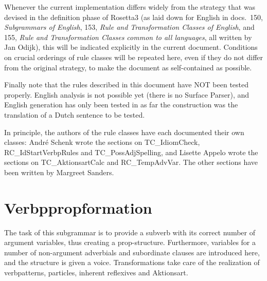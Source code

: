 Whenever the current implementation differs widely from the strategy that was 
devised in the definition phase of Rosetta3 (as laid down for English in docs.\ 
150, {\em Subgrammars of English\/}, 153, {\em Rule and Transformation Classes 
of English\/}, and 155, {\em Rule and Transformation Classes common to all 
languages\/}, all written by Jan Odijk), this will be indicated explicitly in 
the current document. Conditions on crucial orderings of rule classes will be 
repeated here, even if they do not differ from the original strategy, to make 
the document as self-contained as possible.

Finally note that the rules described in this document have NOT been tested 
properly. English analysis is not possible yet (there is no Surface Parser), 
and English generation has only been tested in as far the construction was the 
translation of a Dutch sentence to be tested.

\newpage
In principle, the authors of the rule classes have each documented their own 
classes: Andr\'{e} Schenk wrote the sections on TC\_IdiomCheck, 
RC\_IdStartVerbpRules and TC\_PossAdjSpelling, and Lisette Appelo wrote 
the sections on TC\_AktionsartCalc and RC\_TempAdvVar. The other sections have 
been written by Margreet Sanders.

\newpage
\section{Verbppropformation}
The task of this subgrammar is to provide a subverb with its correct number of 
argument variables, thus creating a prop-structure. Furthermore, variables for 
a number of non-argument adverbials and subordinate clauses are introduced 
here, and the structure is given a voice. Transformations take care of the 
realization of verbpatterns, particles, inherent reflexives and Aktionsart.

